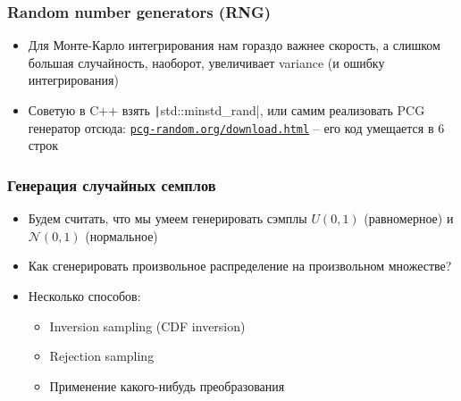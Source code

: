 \documentclass[10pt]{beamer}
\begin{document}
\begin{frame}[fragile]
\frametitle{Random number generators (RNG)}
\begin{itemize}
\item Для Монте-Карло интегрирования нам гораздо важнее скорость, а слишком большая случайность, наоборот, увеличивает variance (и ошибку интегрирования)
\pause
\item Советую в C++ взять \texttt|std::minstd_rand|, или самим реализовать PCG генератор отсюда: \href{https://www.pcg-random.org/download.html}{\texttt{pcg-random.org/download.html}} -- его код умещается в 6 строк
\end{itemize}
\end{frame}

\begin{frame}[fragile]
\frametitle{Генерация случайных семплов}
\begin{itemize}
\item Будем считать, что мы умеем генерировать сэмплы \begin{math}U(0,1)\end{math} (равномерное) и \begin{math}\mathcal{N}(0,1)\end{math} (нормальное)
\pause
\item Как сгенерировать произвольное распределение на произвольном множестве?
\pause
\item Несколько способов:
\pause
\begin{itemize}
\item Inversion sampling (CDF inversion)
\item Rejection sampling
\item Применение какого-нибудь преобразования
\end{itemize}
\end{itemize}
\end{frame}
\end{document}
